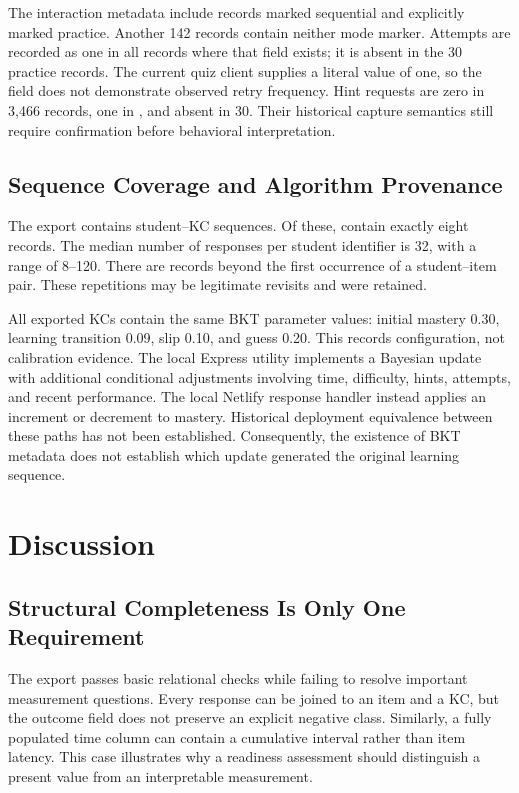 \documentclass[conference]{IEEEtran}
\begin{document}
The interaction metadata include \SequentialCount{} records marked sequential and \PracticeCount{} explicitly marked practice. Another 142 records contain neither mode marker. Attempts are recorded as one in all \AttemptRecordedCount{} records where that field exists; it is absent in the 30 practice records. The current quiz client supplies a literal value of one, so the field does not demonstrate observed retry frequency. Hint requests are zero in 3,466 records, one in \HintOneCount{}, and absent in 30. Their historical capture semantics still require confirmation before behavioral interpretation.

\subsection{Sequence Coverage and Algorithm Provenance}
The export contains \SequenceCount{} student--KC sequences. Of these, \EightSequenceCount{} contain exactly eight records. The median number of responses per student identifier is 32, with a range of 8--120. There are \RepeatCount{} records beyond the first occurrence of a student--item pair. These repetitions may be legitimate revisits and were retained.

All \CatalogKCCount{} exported KCs contain the same BKT parameter values: initial mastery 0.30, learning transition 0.09, slip 0.10, and guess 0.20. This records configuration, not calibration evidence. The local Express utility implements a Bayesian update with additional conditional adjustments involving time, difficulty, hints, attempts, and recent performance. The local Netlify response handler instead applies an increment or decrement to mastery. Historical deployment equivalence between these paths has not been established. Consequently, the existence of BKT metadata does not establish which update generated the original learning sequence.

\section{Discussion}
\subsection{Structural Completeness Is Only One Requirement}
The export passes basic relational checks while failing to resolve important measurement questions. Every response can be joined to an item and a KC, but the outcome field does not preserve an explicit negative class. Similarly, a fully populated time column can contain a cumulative interval rather than item latency. This case illustrates why a readiness assessment should distinguish a present value from an interpretable measurement.
\end{document}
